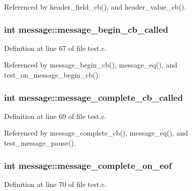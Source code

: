 Referenced by header\+\_\+field\+\_\+cb(), and header\+\_\+value\+\_\+cb().

\subsubsection[{message\+\_\+begin\+\_\+cb\+\_\+called}]{\setlength{\rightskip}{0pt plus 5cm}int message\+::message\+\_\+begin\+\_\+cb\+\_\+called}\label{structmessage_a674d3ea423035ae13baf795c826559ac}


Definition at line 67 of file test.\+c.



Referenced by message\+\_\+begin\+\_\+cb(), message\+\_\+eq(), and test\+\_\+on\+\_\+message\+\_\+begin\+\_\+cb().

\subsubsection[{message\+\_\+complete\+\_\+cb\+\_\+called}]{\setlength{\rightskip}{0pt plus 5cm}int message\+::message\+\_\+complete\+\_\+cb\+\_\+called}\label{structmessage_af6db066c2b49a00c2884a89afefad2b6}


Definition at line 69 of file test.\+c.



Referenced by message\+\_\+complete\+\_\+cb(), message\+\_\+eq(), and test\+\_\+message\+\_\+pause().

\subsubsection[{message\+\_\+complete\+\_\+on\+\_\+eof}]{\setlength{\rightskip}{0pt plus 5cm}int message\+::message\+\_\+complete\+\_\+on\+\_\+eof}\label{structmessage_af193342fc62bb8cfbd6c951138b96341}


Definition at line 70 of file test.\+c.



